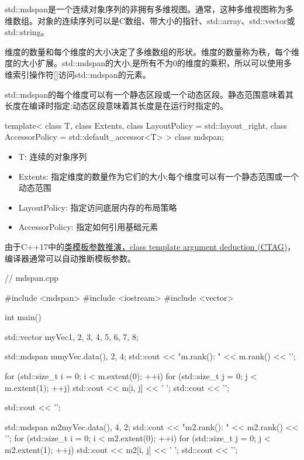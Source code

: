 std::mdspan是一个连续对象序列的非拥有多维视图。通常，这种多维视图称为多维数组。对象的连续序列可以是C数组、带大小的指针、std::array、std::vector或std::string。

维度的数量和每个维度的大小决定了多维数组的形状。维度的数量称为秩，每个维度的大小扩展。std::mdspan的大小,是所有不为0的维度的乘积，所以可以使用多维索引操作符[]访问std::mdspan的元素。

std::mdspan的每个维度可以有一个静态区段或一个动态区段。静态范围意味着其长度在编译时指定;动态区段意味着其长度是在运行时指定的。


\begin{cpp}
template<
	class T,
	class Extents,
	class LayoutPolicy = std::layout_right,
	class AccessorPolicy = std::default_accessor<T>
> class mdspan;
\end{cpp}

\begin{itemize}
\item 
T: 连续的对象序列

\item 
Extents: 指定维度的数量作为它们的大小;每个维度可以有一个静态范围或一个动态范围

\item 
LayoutPolicy: 指定访问底层内存的布局策略

\item 
AccessorPolicy: 指定如何引用基础元素
\end{itemize}

由于C++17中的\href{https://en.cppreference.com/w/cpp/language/class_template_argument_deduction}{类模板参数推演，class template argument deduction (CTAG)}，编译器通常可以自动推断模板参数。


\begin{cpp}
// mdspan.cpp

#include <mdspan>
#include <iostream>
#include <vector>

int main() {

	std::vector myVec{1, 2, 3, 4, 5, 6, 7, 8};
	
	std::mdspan m{myVec.data(), 2, 4};
	std::cout << "m.rank(): " << m.rank() << '\n';
	
	for (std::size_t i = 0; i < m.extent(0); ++i) {
		for (std::size_t j = 0; j < m.extent(1); ++j) {
			std::cout << m[i, j] << ' ';
		}
		std::cout << '\n';
	}
	
	std::cout << '\n';
	
	std::mdspan m2{myVec.data(), 4, 2};
	std::cout << "m2.rank(): " << m2.rank() << '\n';
	for (std::size_t i = 0; i < m2.extent(0); ++i) {
		for (std::size_t j = 0; j < m2.extent(1); ++j) {
			std::cout << m2[i, j] << ' ';
		}
		std::cout << '\n';
	}

}
\end{cpp}

